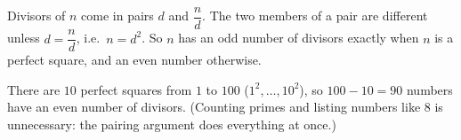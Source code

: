 Divisors of $n$ come in pairs $d$ and $\dfrac {n}{d}$. The two members of a pair are different unless $d=\dfrac {n}{d}$, i.e.\ $n=d^2$. So $n$ has an odd number of divisors exactly when $n$ is a perfect square, and an even number otherwise.

There are $10$ perfect squares from $1$ to $100$ ($1^2,\dots,10^2$), so $100-10=\boxed{90}$ numbers have an even number of divisors. (Counting primes and listing numbers like $8$ is unnecessary: the pairing argument does everything at once.)
